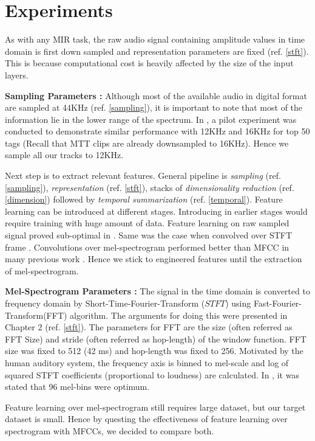 \section{Experiments}
\label{experiments}
As with any MIR task, the raw audio signal containing amplitude values in time domain is first down sampled and representation parameters are fixed (ref. \ref{stft}). This is because computational cost is heavily affected by the size of the input layers.
\bigskip
 
\noindent \textbf{Sampling Parameters : } Although most of the available audio in digital format are sampled at 44KHz (ref. \ref{sampling}), it is important to note that most of the information lie in the lower range of the spectrum. In \cite{choi_cnn}, a pilot experiment was conducted to demonstrate similar performance with 12KHz and 16KHz for top 50 tags (Recall that MTT clips are already downsampled to 16KHz). Hence we sample all our tracks to 12KHz. 
\bigskip

\noindent Next step is to extract relevant features. General pipeline is \textit{sampling} (ref. \ref{sampling}), \textit{representation} (ref. \ref{stft}), stacks of \textit{dimensionality reduction} (ref. \ref{dimension}) followed by \textit{temporal summarization} (ref. \ref{temporal}). Feature learning can be introduced at different stages. Introducing in earlier stages would require training with huge amount of data. Feature learning on raw sampled signal proved sub-optimal in \cite{EndToEnd}. Same was the case when convolved over STFT frame \cite{choi_cnn}. Convolutions over mel-spectrogram performed better than MFCC in many previous work \cite{choi_cnn}\cite{EndToEnd}. Hence we stick to engineered features until the extraction of mel-spectrogram.  
\bigskip 

\noindent \textbf{Mel-Spectrogram Parameters :}
The signal in the time domain is converted to frequency domain by Short-Time-Fourier-Transform ($STFT$) using Fast-Fourier-Transform(FFT) algorithm. The arguments for doing this were presented in Chapter 2 (ref. \ref{stft}). The parameters for FFT are the size (often referred as FFT Size) and stride (often referred as hop-length) of the window function. FFT size was fixed to 512 (42 ms) and hop-length was fixed to 256. Motivated by the human auditory system, the frequency axis is binned to mel-scale and log of squared STFT coefficients (proportional to loudness) are calculated. In \cite{choi_cnn}, it was stated that 96 mel-bins were optimum.   
\bigskip

\noindent Feature learning over mel-spectrogram still requires large dataset, but our target dataset is small. Hence by questing the effectiveness of feature learning over spectrogram with MFCCs, we decided  to compare both.
\bigskip

